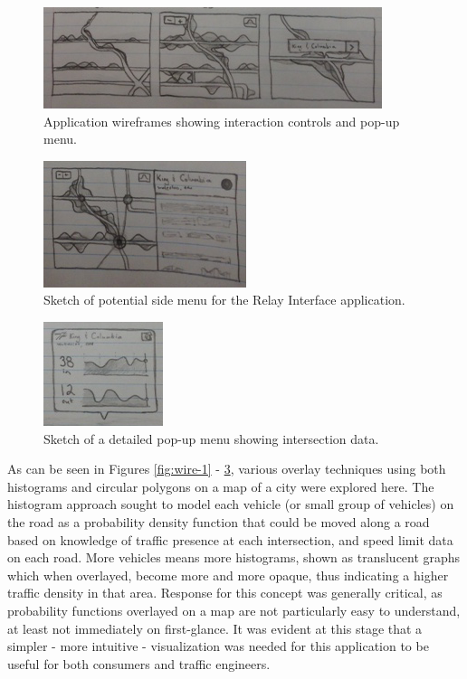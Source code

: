 \documentclass{article}
\begin{document}
\begin{figure}[htbp!]
  \begin{centering}
    \includegraphics[scale=1]{figures/wire-2.png}
    \caption{Application wireframes showing interaction controls and pop-up menu.}
    \label{fig:wire-2}
  \end{centering}
\end{figure}

\begin{figure}[htbp!]
  \begin{centering}
    \includegraphics[scale=1]{figures/wire-4.png}
    \caption{Sketch of potential side menu for the Relay Interface application.}
    \label{fig:wire-3}
  \end{centering}
\end{figure}

\begin{figure}[htbp!]
  \begin{centering}
    \includegraphics[scale=1]{figures/wire-5.png}
    \caption{Sketch of a detailed pop-up menu showing intersection data.}
    \label{fig:wire-4}
  \end{centering}
\end{figure}

As can be seen in Figures \ref{fig:wire-1} - \ref{fig:wire-4}, various overlay techniques using both histograms and circular polygons on a map of a city were explored here.
The histogram approach sought to model each vehicle (or small group of vehicles) on the road as a probability density function that could be moved along a road based on knowledge of traffic presence at each intersection, and speed limit data on each road.
More vehicles means more histograms, shown as translucent graphs which when overlayed, become more and more opaque, thus indicating a higher traffic density in that area.
Response for this concept was generally critical, as probability functions overlayed on a map are not particularly easy to understand, at least not immediately on first-glance.
It was evident at this stage that a simpler - more intuitive - visualization was needed for this application to be useful for both consumers and traffic engineers.\\
\end{document}

